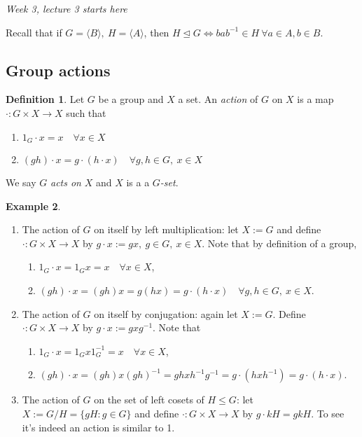 \documentclass[a4paper]{article}
\theoremstyle{definition}
\newtheorem{defn}{Definition}[subsection]
\newtheorem{example}[defn]{Example}
\begin{document}
\begin{flushright}
\textit{Week 3, lecture 3 starts here}
\end{flushright}

Recall that if $G=\langle B\rangle,\ H=\langle A\rangle$, then $H\unlhd G\Leftrightarrow bab^{-1}\in H \ \forall a\in A, b\in B$.

\subsection{Group actions}
\begin{defn}
Let $G$ be a group and $X$ a set. An \textit{action} of $G$ on $X$ is a map $\cdot:G\times X\rightarrow X$ such that
\begin{enumerate}
\item $1_G\cdot x=x \quad \forall x\in X$
\item $(gh)\cdot x = g\cdot (h\cdot x) \quad \forall g,h\in G,\ x\in X$
\end{enumerate}
We say $G$ \textit{acts on} $X$ and $X$ is a a $G$\textit{-set}.
\end{defn}

\begin{example}
\begin{enumerate}
\item The action of $G$ on itself by left multiplication: let $X:=G$ and define $\cdot :G\times X\rightarrow X$ by $g\cdot x:= gx,\ g\in G,\ x\in X$. Note that by definition of a group,
\begin{enumerate}
\item $1_G\cdot x=1_Gx=x \quad \forall x\in X$,
\item $(gh)\cdot x = (gh)x=g(hx)=g\cdot(h\cdot x) \quad \forall g,h\in G,\ x\in X$.
\end{enumerate}
\item The action of $G$ on itself by conjugation: again let $X:=G$. Define $\cdot :G\times X\rightarrow X$ by $g\cdot x := gxg^{-1}$. Note that
\begin{enumerate}
\item $1_G\cdot x = 1_G x 1_G^{-1}=x \quad \forall x\in X$,
\item $(gh)\cdot x=(gh)x(gh)^{-1}=ghxh^{-1}g^{-1}=g\cdot \left(hxh^{-1}\right)=g\cdot (h\cdot x)$.
\end{enumerate}
\item The action of $G$ on the set of left cosets of $H\leq G$: let $X:=G/H=\{gH:g\in G\}$ and define $\cdot : G\times X\rightarrow X$ by $g\cdot kH=gkH$. To see it's indeed an action is similar to 1.
\end{enumerate} 
\end{example}
\end{document}
